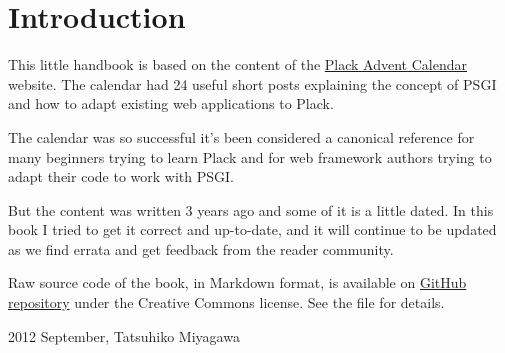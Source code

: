 \chapter{Introduction}\label{introduction}

This little handbook is based on the content of the
\href{http://advent.plackperl.org/}{Plack Advent Calendar} website. The
calendar had 24 useful short posts explaining the concept of PSGI and
how to adapt existing web applications to Plack.

The calendar was so successful it's been considered a canonical
reference for many beginners trying to learn Plack and for web framework
authors trying to adapt their code to work with PSGI.

But the content was written 3 years ago and some of it is a little
dated. In this book I tried to get it correct and up-to-date, and it
will continue to be updated as we find errata and get feedback from the
reader community.

Raw source code of the book, in Markdown format, is available on
\href{https://github.com/miyagawa/plack-handbook}{GitHub repository}
under the Creative Commons license. See the  file for details.

2012 September, Tatsuhiko Miyagawa


